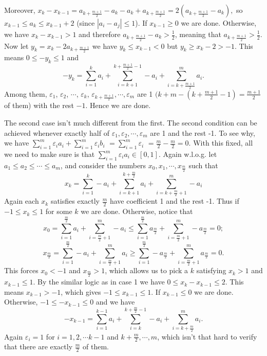 \documentclass[11pt,a4paper]{article}
\begin{document}
\begin{itemize}
Moreover, $x_k-x_{k-1}=a_{k+\frac{m+1}{2}}-a_{k}-a_{k}+a_{k+\frac{m+1}{2}}=2(a_{k+\frac{m+1}{2}}-a_{k}), $
so $x_{k-1}\le a_k\le x_{k-1}+2$ (since $|a_i-a_j|\le 1$). 
If $x_{k-1}\ge 0$ we are done. 
Otherwise, we have $x_k-x_{k-1}>1$ and therefore $a_{k+\frac{m+1}{2}}-a_{k}>\frac 12$, 
meaning that $a_{k+\frac{m+1}{2}}>\frac 12$. 
Now let $y_k=x_k-2a_{k+\frac{m+1}{2}}$ we have $y_k\le x_{k-1}<0$ but $y_k\ge x_k-2>-1$. 
This means $0\le -y_k\le 1$ and 
\[-y_k=\sum_{i=1}^{k} a_i+\sum_{i=k+1}^{k+\frac{m+1}{2}-1} -a_i+\sum_{i=k+\frac{m+1}{2}}^{m} a_i.\] 
Among them, $\varepsilon_1$, $\varepsilon_2$, $\cdots$, $\varepsilon_k$, $\varepsilon_{k+\frac{m+1}2}, \cdots, \varepsilon_m$ are 1 $(k+m-(k+\frac{m+1}2-1)=\frac{m+1}2$ of them) with the rest $-1$. Hence we are done. 

The second case isn't much different from the first. 
The second condition can be achieved whenever exactly half of $\varepsilon_1, \varepsilon_2, \cdots , \varepsilon_m$ are 1 and the rest -1. 
To see why, we have 
$ \sum_{i=1}^m \varepsilon_i a_i  + \sum_{i=1}^m \varepsilon_i b_i $
$=\sum_{i=1}^m \varepsilon_i$
$=\frac m2-\frac m2=0$. 
With this fixed, all we need to make sure is that 
$ \sum_{i=1}^m \varepsilon_i a_i \in [0,1]$. 
Again w.l.o.g. let $a_1\le a_2\le\cdots \le a_m$, and consider the numbers 
$x_0, x_1, \cdots , x_{\frac{m}2}$ such that 
\[ x_k=\sum_{i=1}^{k} -a_i+\sum_{i=k+1}^{k+\frac{m}{2}} a_i+\sum_{i=k+\frac{m}{2}+1}^{m} -a_i\]
Again each $x_k$ satisfies exactly $\frac m2$ have coefficient 1 and the rest -1. 
Thus if $-1\le x_k\le 1$ for some $k$ we are done. 
Otherwise, notice that
\[x_0=\sum_{i=1}^{\frac{m}{2}} a_i+\sum_{i=\frac{m}{2}+1}^{m} -a_i
\le \sum_{i=1}^{\frac{m}{2}} a_{\frac{m}{2}} +\sum_{i=\frac{m}{2}+1}^{m} -a_{\frac{m}{2}}
=0;\]
\[x_{\frac{m}{2}}=\sum_{i=1}^{\frac{m}{2}} -a_i+\sum_{i=\frac{m}{2}+1}^{m} a_i
\ge \sum_{i=1}^{\frac{m}{2}} -a_{\frac{m}{2}} +\sum_{i=\frac{m}{2}+1}^{m} a_{\frac{m}{2}}
=0.\]
This forces $x_0<-1$ and $x_{\frac m2}>1$, 
which allows us to pick a $k$ satisfying $x_k>1$ and $x_{k-1}\le 1$. 
By the similar logic as in case 1 we have $0\le x_k-x_{k-1}\le 2$. 
This means $x_{k-1}>-1$, which gives $-1\le x_{k-1}\le 1$. 
If $x_{k-1}\le 0$ we are done. Otherwise, $-1\le -x_{k-1}\le 0$ and we have 
\[-x_{k-1}=\sum_{i=1}^{k-1} a_i+\sum_{i=k}^{k+\frac{m}{2}-1} -a_i+\sum_{i=k+\frac{m}{2}}^{m} a_i.\]
Again $\varepsilon_i=1$ for $i=1, 2, \cdots k-1$ and $k+\frac{m}{2}, \cdots, m$, which isn't that hard to verify that there are exactly $\frac m2$ of them. 


\end{itemize}
\end{document}
